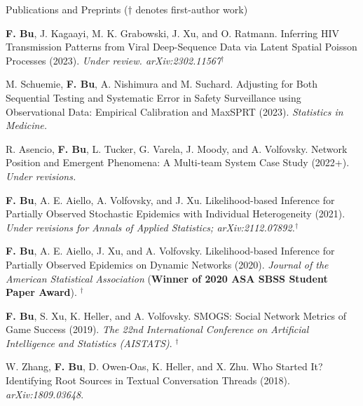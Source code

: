 \documentclass{resume} %
\begin{document}
\begin{rSection}{Publications and Preprints}
{\footnotesize{($\dagger$ denotes first-author work)}}


\textbf{F. Bu}, J. Kagaayi, M. K. Grabowski, J. Xu, and O. Ratmann.
Inferring HIV Transmission Patterns from Viral Deep-Sequence Data via Latent Spatial Poisson Processes (2023). \emph{Under review. arXiv:2302.11567}$^\dagger$

\smallskip

M. Schuemie, \textbf{F. Bu}, A. Nishimura and M. Suchard.
Adjusting for Both Sequential Testing and Systematic Error in Safety Surveillance using Observational Data: Empirical Calibration and MaxSPRT (2023). \emph{Statistics in Medicine.}

\smallskip

R. Asencio, \textbf{F. Bu}, L. Tucker, G. Varela, J. Moody, and A. Volfovsky. 
Network Position and Emergent Phenomena: A Multi-team System Case Study (2022+). \emph{Under revisions.}

\smallskip

\textbf{F. Bu}, A. E. Aiello, A. Volfovsky, and J. Xu.  
Likelihood-based Inference for Partially Observed Stochastic Epidemics with Individual Heterogeneity (2021). \emph{Under revisions for Annals of Applied Statistics; arXiv:2112.07892.}$^\dagger$

\smallskip


\textbf{F. Bu}, A. E. Aiello, J. Xu, and A. Volfovsky. 
Likelihood-based Inference for Partially Observed Epidemics on Dynamic Networks (2020). \emph{Journal of the American Statistical Association} (\textbf{Winner of 2020 ASA SBSS Student Paper Award}). $^\dagger$

\smallskip

\textbf{F. Bu}, S. Xu, K. Heller, and A. Volfovsky. 
SMOGS: Social Network Metrics of Game Success (2019). \emph{The 22nd International Conference on Artificial Intelligence and Statistics (AISTATS)}. $^\dagger$

\smallskip

W. Zhang, \textbf{F. Bu}, D. Owen-Oas, K. Heller, and X. Zhu. 
Who Started It? Identifying Root Sources in Textual Conversation Threads (2018). \emph{arXiv:1809.03648}.

\end{rSection}

\end{document}
